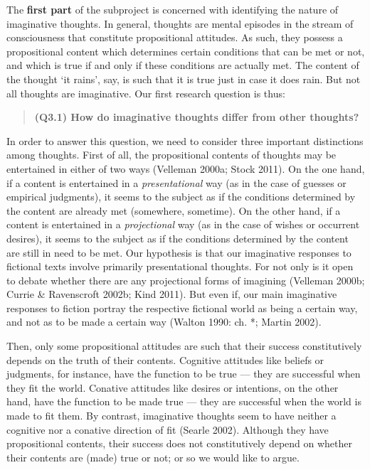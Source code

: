 The \textbf{first part} of the subproject is concerned with identifying the nature of imaginative thoughts. In general, thoughts are mental episodes in the stream of consciousness that constitute propositional attitudes. As such, they possess a propositional content which determines certain conditions that can be met or not, and which is true if and only if these conditions are actually met. The content of the thought `it rains', say, is such that it is true just in case it does rain. But not all thoughts are imaginative. Our first research question is thus:

\vspace{-.2cm}
\begin{quote}
\textbf{(Q3.1) How do imaginative thoughts differ from other thoughts?}
\end{quote}
\vspace{-.2cm}

\noindent In order to answer this question, we need to consider three important distinctions among thoughts. First of all, the propositional contents of thoughts may be entertained in either of two ways (Velleman 2000a; Stock 2011). On the one hand, if a content is entertained in a \emph{presentational} way (as in the case of guesses or empirical judgments), it seems to the subject as if the conditions determined by the content are already met (somewhere, sometime). On the other hand, if a content is entertained in a \emph{projectional} way (as in the case of wishes or occurrent desires), it seems to the subject as if the conditions determined by the content are still in need to be met. Our hypothesis is that our imaginative responses to fictional texts involve primarily presentational thoughts. For not only is it open to debate whether there are any projectional forms of imagining (Velleman 2000b; Currie \& Ravenscroft 2002b; Kind 2011). But even if, our main imaginative responses to fiction portray the respective fictional world as being a certain way, and not as to be made a certain way (Walton 1990: ch. *; Martin 2002).

Then, only some propositional attitudes are such that their success constitutively depends on the truth of their contents. Cognitive attitudes like beliefs or judgments, for instance, have the function to be true --- they are successful when they fit the world. Conative attitudes like desires or intentions, on the other hand, have the function to be made true --- they are successful when the world is made to fit them. By contrast, imaginative thoughts seem to have neither a cognitive nor a conative direction of fit (Searle 2002). Although they have propositional contents, their success does not constitutively depend on whether their contents are (made) true or not; or so we would like to argue.

